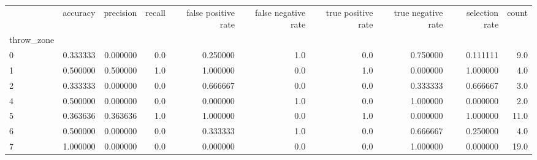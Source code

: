 \begin{tabular}{lrrrrrrrrr}
\toprule
{} &  accuracy &  precision &  recall &  false positive rate &  false negative rate &  true positive rate &  true negative rate &  selection rate &  count \\
throw\_zone &           &            &         &                      &                      &                     &                     &                 &        \\
\midrule
0          &  0.333333 &   0.000000 &     0.0 &             0.250000 &                  1.0 &                 0.0 &            0.750000 &        0.111111 &    9.0 \\
1          &  0.500000 &   0.500000 &     1.0 &             1.000000 &                  0.0 &                 1.0 &            0.000000 &        1.000000 &    4.0 \\
2          &  0.333333 &   0.000000 &     0.0 &             0.666667 &                  0.0 &                 0.0 &            0.333333 &        0.666667 &    3.0 \\
4          &  0.500000 &   0.000000 &     0.0 &             0.000000 &                  1.0 &                 0.0 &            1.000000 &        0.000000 &    2.0 \\
5          &  0.363636 &   0.363636 &     1.0 &             1.000000 &                  0.0 &                 1.0 &            0.000000 &        1.000000 &   11.0 \\
6          &  0.500000 &   0.000000 &     0.0 &             0.333333 &                  1.0 &                 0.0 &            0.666667 &        0.250000 &    4.0 \\
7          &  1.000000 &   0.000000 &     0.0 &             0.000000 &                  0.0 &                 0.0 &            1.000000 &        0.000000 &   19.0 \\
\bottomrule
\end{tabular}
